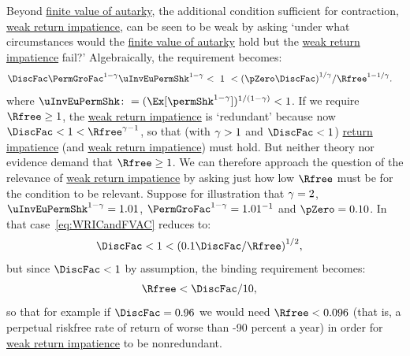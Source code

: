 \documentclass[\econtexRoot/BufferStockTheory]{subfiles}
\begin{document}
Beyond \hyperlink{FVAC}{finite value of autarky},
the additional condition sufficient for contraction, \hyperlink{WRIC}{weak return impatience}, can be seen to be weak by asking `under what circumstances would the \hyperlink{FVAC}{finite value of autarky} hold but the \hyperlink{WRIC}{weak return impatience} fail?'  Algebraically, the requirement becomes:
%
\begin{equation}\begin{gathered}\begin{aligned}
  \DiscFac \PermGroFac^{1-\CRRA}\uInvEuPermShk^{1-\CRRA} & < ~ 1 ~ <  {(\pZero \DiscFac)}^{1/\CRRA}/\Rfree^{1-1/\CRRA}. \label{eq:WRICandFVAC}
\end{aligned}\end{gathered}\end{equation}
%
\hypertarget{uInvEuPermShk}{}
where $\uInvEuPermShk \colon = (\Ex[\permShk^{1-\CRRA}])^{1/(1-\CRRA)} < 1$.
If we require $\Rfree \geq 1$, the \hyperlink{WRIC}{weak return impatience} is `redundant' because now $\DiscFac <1<\Rfree^{\CRRA-1}$, so that (with $\gamma > 1$ and $\DiscFac<1$) \hyperlink{RIC}{return impatience} (and \hyperlink{WRIC}{weak return impatience}) must hold.
But neither theory nor evidence demand that $\Rfree \geq 1$.
We can therefore approach the question of the relevance of \hyperlink{WRIC}{weak return impatience}  by asking just how low $\Rfree$ must be for the condition to be relevant.
Suppose for illustration that $\gamma=2$, $\uInvEuPermShk^{1-\CRRA}=1.01$, $\PermGroFac^{1-\CRRA}=1.01^{-1}$ and $\pZero = 0.10$.
In that case~\eqref{eq:WRICandFVAC} reduces to:
\begin{equation}\begin{gathered}\begin{aligned}
  \DiscFac  & < 1 < {(0.1 \DiscFac/\Rfree)}^{1/2},
\end{aligned}\end{gathered}\end{equation}
but since $\DiscFac < 1$ by assumption, the binding requirement becomes:
\begin{equation}\begin{gathered}\begin{aligned}
  \Rfree  & < \DiscFac/10, \notag
\end{aligned}\end{gathered}\end{equation}
so that for example if $\DiscFac=0.96$ we would need $\Rfree < 0.096$ (that is, a perpetual riskfree rate of return of worse than -90 percent a year) in order for \hyperlink{WRIC}{weak return impatience} to be nonredundant.
\end{document}
